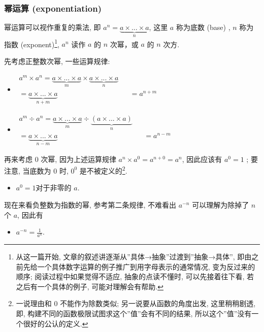 \hypertarget{ux5e42ux8fd0ux7b97-exponentiation}{%
\subsubsection{幂运算
(exponentiation)}\label{ux5e42ux8fd0ux7b97-exponentiation}}

幂运算可以视作重复的乘法, 即
\(a^n=\underbrace{a\times ...\times a}_{n}\), 这里 \(a\) 称为底数 (base)
, \(n\) 称为指数 (exponent)\footnote{从这一篇开始,
  文章的叙述讲逐渐从''具体→抽象''过渡到''抽象→具体'',
  即由之前先给一个具体数字运算的例子推广到用字母表示的通常情况,
  变为反过来的顺序; 阅读过程中如果觉得不适应, 抽象的点读不懂时,
  可以先接着往下看, 若之后有一个具体的例子, 可能对理解会有帮助.},
\(a^n\) 读作 \(a\) 的 \(n\) 次幂，或 \(a\) 的 \(n\) 次方.

先考虑正整数次幂, 一些运算规律:

\begin{itemize}
\tightlist
\item
  \(\begin{align*}a^m\times a^n=\underbrace{a\times ...\times a}_{m}\times\underbrace{a\times ...\times a}_{n}&&\\  =\underbrace{a\times ...\times a}_{n+m}&&=a^{n+m}\end{align*}\)
\item
  \(\begin{align*}a^m\div a^n=\underbrace{a\times ...\times a}_{m}\div\underbrace{(a\times ...\times a)}_{n}&&\\  =\underbrace{a\times ...\times a}_{n-m}&&=a^{n-m}\end{align*}\)
\end{itemize}

再来考虑 \(0\) 次幂, 因为上述运算规律 \(a^n\times a^0=a^{n+0}=a^n\),
因此应该有 \(a^0=1\) ; 要注意, 当底数为 \(0\) 时, \(0^0\)
是不被定义的\footnote{一说理由和 \(0\) 不能作为除数类似;
  另一说要从函数的角度出发, 这里稍稍剧透, 即,
  构建不同的函数极限试图求这个''值''会有不同的结果,
  所以这个''值''没有一个很好的公认的定义.}.

\begin{itemize}
\tightlist
\item
  \(a^0=1\)对于非零的 \(a\).
\end{itemize}

现在来看负整数为指数的幂, 参考第二条规律, 不难看出 \(a^{-n}\)
可以理解为除掉了 \(n\) 个 \(a\), 因此有

\begin{itemize}
\tightlist
\item
  \(a^{-n}=\frac{1}{a^n}\).
\end{itemize}

